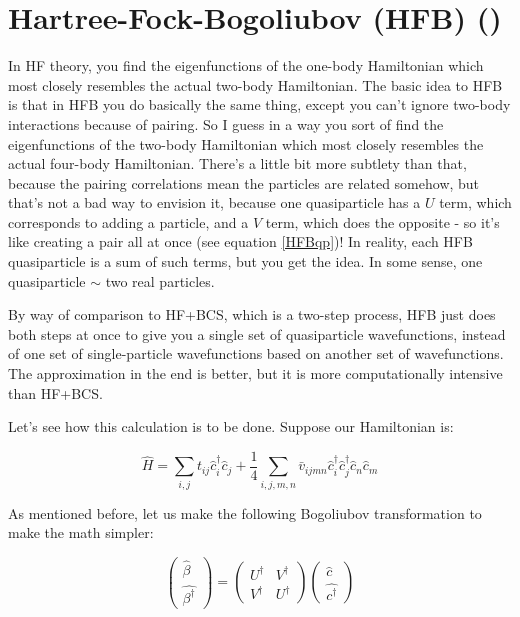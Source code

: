 \section*{Hartree-Fock-Bogoliubov (HFB)  (\cite{ring1980nuclear,Balbuena2003})}
In HF theory, you find the eigenfunctions of the one-body Hamiltonian which most closely resembles the actual two-body Hamiltonian. The basic idea to HFB is that in HFB you do basically the same thing, except you can't ignore two-body interactions because of pairing. So I guess in a way you sort of find the eigenfunctions of the two-body Hamiltonian which most closely resembles the actual four-body Hamiltonian. There's a little bit more subtlety than that, because the pairing correlations mean the particles are related somehow, but that's not a bad way to envision it, because one quasiparticle has a $U$ term, which corresponds to adding a particle, and a $V$ term, which does the opposite - so it's like creating a pair all at once (see equation \ref{HFBqp})! In reality, each HFB quasiparticle is a sum of such terms, but you get the idea. In some sense, one quasiparticle $\sim$ two real particles.

By way of comparison to HF+BCS, which is a two-step process, HFB just does both steps at once to give you a single set of quasiparticle wavefunctions, instead of one set of single-particle wavefunctions based on another set of wavefunctions. The approximation in the end is better, but it is more computationally intensive than HF+BCS.

Let's see how this calculation is to be done. Suppose our Hamiltonian is:

\begin{equation}
\hat{H}=\sum\limits_{i,j} t_{ij} \hat{c}_i^\dagger \hat{c}_j + \frac{1}{4}\sum\limits_{i,j,m,n} \bar{v}_{ijmn} \hat{c}_i^\dagger \hat{c}_j^\dagger \hat{c}_n \hat{c}_m
\end{equation}

As mentioned before, let us make the following Bogoliubov transformation to make the math simpler:

\begin{equation}
\left(\begin{array}{c}
\hat{\beta} \\
\hat{\beta^\dagger}
\end{array}\right)
= \left(\begin{array}{cc}
U^\dagger & V^\dagger \\
V^\dagger & U^\dagger
\end{array}\right) \left(\begin{array}{c}
\hat{c} \\
\hat{c^\dagger}
\end{array}\right) \label{HFBqp}
\end{equation}

